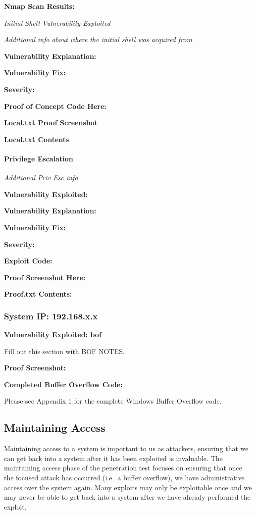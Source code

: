 \textbf{Nmap Scan Results:}

\emph{Initial Shell Vulnerability Exploited}

\emph{Additional info about where the initial shell was acquired from}

\textbf{Vulnerability Explanation:}

\textbf{Vulnerability Fix:}

\textbf{Severity:}

\textbf{Proof of Concept Code Here:}

\textbf{Local.txt Proof Screenshot}

\textbf{Local.txt Contents}

\hypertarget{privilege-escalation-3}{%
\paragraph{Privilege Escalation}\label{privilege-escalation-3}}

\emph{Additional Priv Esc info}

\textbf{Vulnerability Exploited:}

\textbf{Vulnerability Explanation:}

\textbf{Vulnerability Fix:}

\textbf{Severity:}

\textbf{Exploit Code:}

\textbf{Proof Screenshot Here:}

\textbf{Proof.txt Contents:}

\hypertarget{system-ip-192.168.x.x-4}{%
\subsubsection{System IP: 192.168.x.x}\label{system-ip-192.168.x.x-4}}

\textbf{Vulnerability Exploited: bof}

Fill out this section with BOF NOTES.

\textbf{Proof Screenshot:}

\textbf{Completed Buffer Overflow Code:}

Please see Appendix 1 for the complete Windows Buffer Overflow code.

\hypertarget{maintaining-access}{%
\subsection{Maintaining Access}\label{maintaining-access}}

Maintaining access to a system is important to us as attackers, ensuring
that we can get back into a system after it has been exploited is
invaluable. The maintaining access phase of the penetration test focuses
on ensuring that once the focused attack has occurred (i.e.~a buffer
overflow), we have administrative access over the system again. Many
exploits may only be exploitable once and we may never be able to get
back into a system after we have already performed the exploit.


